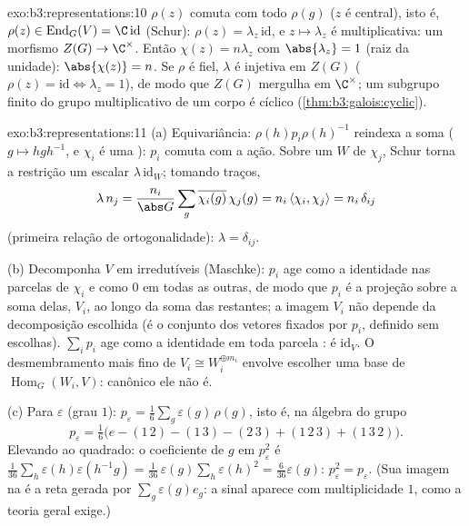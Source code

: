 \begin{solution}{exo:b3:representations:10}
$\rho(z)$ comuta com todo $\rho(g)$ ($z$ é central), isto é,
$\rho(z) \in \operatorname{End}_G(V) = \C\,\mathrm{id}$ (Schur):
$\rho(z) = \lambda_z\,\mathrm{id}$, e $z \mapsto \lambda_z$ é
multiplicativa: um morfismo $Z(G) \to \C^\times$. Então
$\chi(z) = n\lambda_z$ com $\abs{\lambda_z} = 1$ (raiz da
unidade): $\abs{\chi(z)} = n$. Se $\rho$ é fiel, $\lambda$ é
injetiva em $Z(G)$ ($\rho(z) = \mathrm{id} \iff \lambda_z =
1$), de modo que $Z(G)$ mergulha em $\C^\times$; um subgrupo finito do grupo
multiplicativo de um corpo é cíclico
(\cref{thm:b3:galois:cyclic}).
\end{solution}

\begin{solution}{exo:b3:representations:11}
(a) Equivariância: $\rho(h)p_i\rho(h)^{-1}$ reindexa a soma
($g \mapsto hgh^{-1}$, e $\chi_i$ é uma ):
$p_i$ comuta com a ação. Sobre um  $W$ de
 $\chi_j$, Schur torna a restrição um escalar
$\lambda\,\mathrm{id}_W$; tomando traços,
\[
\lambda\,n_j = \frac{n_i}{\abs G}\sum_g
\overline{\chi_i(g)}\,\chi_j(g) = n_i\,\langle\chi_i,
\chi_j\rangle = n_i\,\delta_{ij}
\]
(primeira relação de ortogonalidade): $\lambda = \delta_{ij}$.

(b) Decomponha $V$ em irredutíveis (Maschke): $p_i$ age como a
identidade nas parcelas de  $\chi_i$ e como $0$ em
todas as outras, de modo que $p_i$ é a projeção sobre a soma delas, $V_i$,
ao longo da soma das restantes; a imagem $V_i$ não depende da
decomposição escolhida (é o conjunto dos vetores fixados por
$p_i$, definido sem escolhas). $\sum_ip_i$ age como a identidade
em toda parcela : é $\mathrm{id}_V$. O
desmembramento mais fino de $V_i \cong W_i^{\oplus m_i}$ envolve
escolher uma base de $\operatorname{Hom}_G(W_i, V)$: canônico
ele não é.

(c) Para $\varepsilon$ (grau $1$): $p_\varepsilon =
\frac1{6}\sum_{g}\varepsilon(g)\,\rho(g)$, isto é, na álgebra
do grupo
\[
p_\varepsilon = \tfrac16\bigl(e - (1\,2) - (1\,3) - (2\,3)
+ (1\,2\,3) + (1\,3\,2)\bigr) .
\]
Elevando ao quadrado: o coeficiente de $g$ em $p_\varepsilon^2$ é
$\frac1{36}\sum_{h}\varepsilon(h)\varepsilon(h^{-1}g) =
\frac1{36}\,\varepsilon(g)\sum_h\varepsilon(h)^2 =
\frac{6}{36}\varepsilon(g)$: $p_\varepsilon^2 =
p_\varepsilon$. (Sua imagem na  é
a reta gerada por $\sum_g\varepsilon(g)e_g$: a 
sinal aparece com multiplicidade $1$, como a teoria geral
exige.)
\end{solution}

